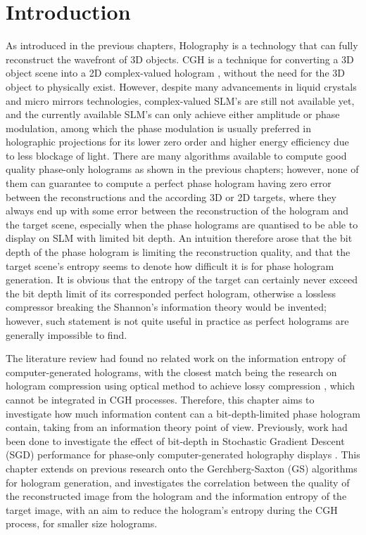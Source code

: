 \section{Introduction}
	As introduced in the previous chapters, Holography is a technology that can fully reconstruct the wavefront of 3D objects. CGH is a technique for converting a 3D object scene into a 2D complex-valued hologram \cite{Tsang2018}, without the need for the 3D object to physically exist. However, despite many advancements in liquid crystals and micro mirrors technologies, complex-valued SLM's are still not available yet, and the currently available SLM's can only achieve either amplitude or phase modulation, among which the phase modulation is usually preferred in holographic projections for its lower zero order and higher energy efficiency due to less blockage of light. There are many algorithms available to compute good quality phase-only holograms as shown in the previous chapters; however, none of them can guarantee to compute a perfect phase hologram having zero error between the reconstructions and the according 3D or 2D targets, where they always end up with some error between the reconstruction of the hologram and the target scene, especially when the phase holograms are quantised to be able to display on SLM with limited bit depth. An intuition therefore arose that the bit depth of the phase hologram is limiting the reconstruction quality, and that the target scene's entropy seems to denote how difficult it is for phase hologram generation. It is obvious that the entropy of the target can certainly never exceed the bit depth limit of its corresponded perfect hologram, otherwise a lossless compressor breaking the Shannon's information theory \cite{Shannon1948} would be invented; however, such statement is not quite useful in practice as perfect holograms are generally impossible to find.

	The literature review had found no related work on the information entropy of computer-generated holograms, with the closest match being the research on hologram compression using optical method to achieve lossy compression \cite{Kollin1988}, which cannot be integrated in CGH processes. Therefore, this chapter aims to investigate how much information content can a bit-depth-limited phase hologram contain, taking from an information theory point of view. Previously, work had been done to investigate the effect of bit-depth in Stochastic Gradient Descent (SGD) performance for phase-only computer-generated holography displays \cite{Kadis2022}. This chapter extends on previous research onto the Gerchberg-Saxton (GS) \cite{Gerchberg1972} algorithms for hologram generation, and investigates the correlation between the quality of the reconstructed image from the hologram and the information entropy of the target image, with an aim to reduce the hologram's entropy during the CGH process, for smaller size holograms.


